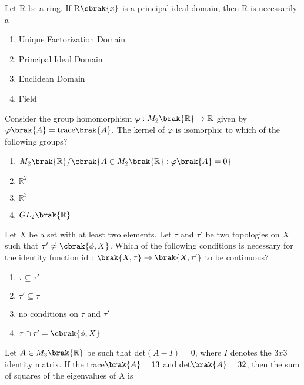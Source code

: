 \iffalse
\chapter{2014}
\author{AI24BTECH11033}
\section{me}
\fi

  \item Let R be a ring. If R$\sbrak{x}$ is a principal ideal domain, then R is necessarily a
  \begin{enumerate}
      \item Unique Factorization Domain
      \item Principal Ideal Domain
      \item Euclidean Domain
      \item Field
  \end{enumerate}
  \item Consider the group homomorphism $\varphi : M_2\brak{\mathbb{R}} \rightarrow \mathbb{R}$ given by $\varphi \brak{A} = \text{trace}\brak{A}$. The kernel of $\varphi$ is isomorphic to which of the following groups?
\begin{enumerate}
    \item $M_2\brak{\mathbb{R}} / \cbrak{ A \in M_2\brak{\mathbb{R}} : \varphi\brak{A} = 0 }$
    \item $\mathbb{R}^2$
    \item $\mathbb{R}^3$
    \item $GL_2\brak{\mathbb{R}}$
\end{enumerate}
   \item Let $X$ be a set with at least two elements. Let $\tau$ and $\tau'$ be two topologies on $X$ such that $\tau' \neq  \cbrak{\phi , X}$. Which of the following conditions is necessary for the identity function id : $\brak{X , \tau} \rightarrow \brak{X , \tau'}$ to be continuous? 
   \begin{enumerate}
      \item $\tau \subseteq \tau'$
      \item $\tau' \subseteq \tau$
      \item no conditions on $\tau$ and $\tau'$
      \item $\tau \cap \tau' = \cbrak{\phi, X}$
  \end{enumerate}
  \item Let $A \in M_3\brak{\mathbb{R}}$ be such that det$(A-I) = 0$, where $I$ denotes the $3 x 3$ identity matrix. If the trace$\brak{A} = 13$ and det$\brak{A} = 32$, then the sum of squares of the eigenvalues of A is \underline{\hspace{2cm}} 
